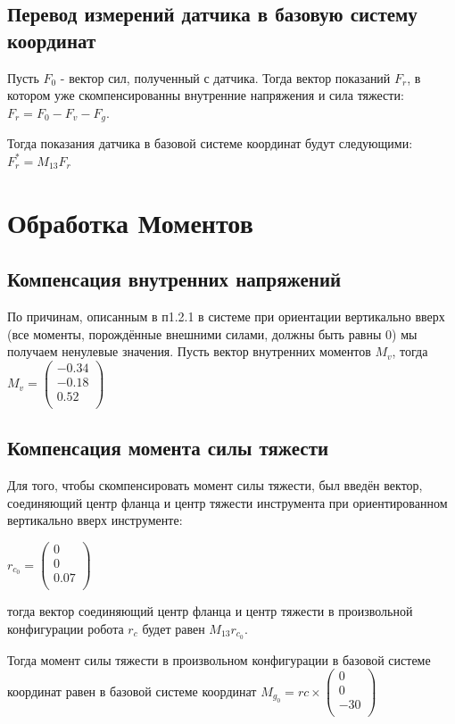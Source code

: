 \documentclass[a4paper,14pt,russian]{extreport} \usepackage{extsizes}
\begin{document}
		\subsection{Перевод измерений датчика в базовую систему координат}
		Пусть $F_{0}$ - вектор сил, полученный с датчика. Тогда вектор показаний $F_{r}$, в котором уже скомпенсированны внутренние напряжения и сила тяжести:
		$F_{r}=	F_{0}-F_{v}-F_{g}$.
		
		Тогда показания датчика в базовой системе координат будут следующими:
		$F_{r}^*=M_{13}F_{r}$
		\section{Обработка Моментов}
		\subsection{Компенсация внутренних напряжений}
		По причинам, описанным в п1.2.1 в системе при ориентации вертикально вверх (все моменты, порождённые внешними силами, должны быть равны 0)
		мы получаем ненулевые значения. 
		Пусть вектор внутренних моментов $M_{v}$, тогда 
		$M_{v}= \begin{pmatrix}
		-0.34 \\ -0.18 \\ 0.52\\
		\end{pmatrix}$
		\subsection{Компенсация момента силы тяжести}
		Для того, чтобы скомпенсировать момент силы тяжести, был введён вектор, соединяющий центр фланца и центр тяжести инструмента при ориентированном вертикально вверх инструменте:
		
		$r_{c_0} =  \begin{pmatrix}
		0 \\ 0 \\ 0.07\\
		\end{pmatrix}$
		
		тогда вектор соединяющий центр фланца и центр тяжести в произвольной конфигурации робота $r_{c}$ будет равен $M_{13}r_{c_0}$.
		
		Тогда момент силы тяжести в произвольном конфигурации в базовой системе координат равен в базовой системе координат $M_{g_0}=r{c}\times\begin{pmatrix}
		0 \\ 0 \\ -30\\
		\end{pmatrix}$
		
\end{document}
